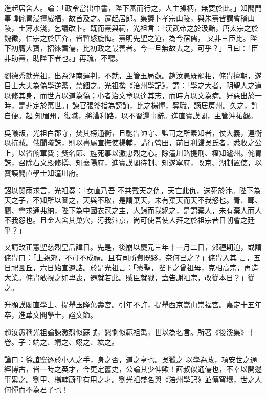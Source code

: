 \begin{pinyinscope}
 進起居舍人。論：「政令當出中書，陛下審而行之，人主操柄，無要於此。」知閣門事韓侂胄浸擅威福，故首及之。遷起居郎。集議卜孝宗山陵，與朱熹皆謂會稽山陵，土薄水淺，乞議改卜。既而熹與祠，光祖言：「漢武帝之於汲黯，唐太宗之於魏徵，仁宗之於唐介，皆暫怒旋悔。熹明先聖之道，為今宿儒，
 又非三臣比。陛下初膺大寶，招徠耆儒，比初政之最善者。今一旦無故去之，可乎？」且曰：「臣非助熹，助陛下者也。」再疏，不聽。



 劉德秀劾光祖，出為湖南運判，不就，主管玉局觀。趙汝愚既罷相，侂胄擅朝，遂目士大夫為偽學逆黨，禁錮之。光祖撰《涪州學記》，謂：「學之大者，明聖人之道以修其身，而世方以道為偽；小者治文章以達其志，而時方以文為病。好惡出於一時，是非定於萬世。」諫官張釜指為謗訕，比之楊惲，奪職，謫居房州。久之，許自便。起
 知眉州，復職，將漕利路，以不習邊事辭。進直寶謨閣，主管沖祐觀。



 吳曦叛，光祖白郡守，焚其榜通衢，且馳告帥守、監司之所素知者，仗大義，連衡以抗賊。俄聞曦誅，則以書屬宣撫使楊輔，講行營田，前日利歸吳氏者，悉收之公上，以省餉軍費；獎名節、旌死事以激忠烈之心。除潼川路提刑、權知瀘州。侂胄誅，召除右文殿修撰、知襄陽府，進寶謨閣待制、知遂寧府，改京、湖制置使，以寶謨閣直學士知潼川府。



 詔以閔雨求言，光祖奏：「女直乃吾
 不共戴天之仇，天亡此仇，送死於汴。陛下為天之子，不知所以圖之，天與不取，是謂棄天，未有棄天而天不我怒也。青、鄆、藺、會求通弗納，陛下為中國衣冠之主，人歸而我絕之，是謂棄人，未有棄人而人不我怨也。且金人舍其巢穴，污我汴京，尚可使吾使人拜之於祖宗昔日朝會之廷乎？」



 又請改正憲聖慈烈皇后諱日。先是，後崩以慶元三年十一月二日，郊禋期迫，或謂侂胄曰：「上親郊，不可不成禮。且有司所費既夥，奈何已之？」侂胄入其
 言，五日祀圜丘，六日始宣遺誥。於是光祖言：「憲聖，陛下之曾祖母，克相高宗，再造大業。侂胄敢視之如卑喪，遷就若此。賊臣就戮，盍告謝祖宗，改從本日？」從之。



 升顯謨閣直學士、提舉玉隆萬壽宮。引年不許，提舉西京嵩山崇福宮。嘉定十五年卒，進華文閣學士，謚文節。



 趙汝愚稱光祖論諫激烈似蘇軾，懇惻似範祖禹，世以為名言。所著《後溪集》十卷。子：端之、靖之、翊之、竑之。



 論曰：徐誼竄逐於小人之手，身之否，道之亨也。吳獵之
 以學為政，項安世之通經博古，皆一時之英才，今更定舊史，公論其少伸歟！薛叔似通儒也，不幸以開邊事累之。劉甲、楊輔蔚乎有用之才。劉光祖盛名與《涪州學記》並傳穹壤，世之人何憚而不為君子也！



\end{pinyinscope}